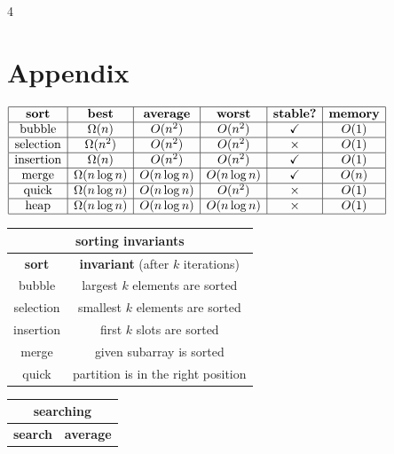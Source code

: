 \documentclass[fontsize=6pt, landscape, a4paper]{scrartcl}
\newenvironment{tightcenter}{%
  \setlength\topsep{0pt}
  \setlength\parskip{0pt}
  \begin{center}
}{%
  \end{center}
}
\begin{document}
\begin{multicols*}{4}
        \section*{Appendix}
        \begin{tightcenter}
        $
            \begin{array}{| c | c | c | c | c | c |}
                \hline\textbf{sort} & \textbf{best} & \textbf{average} & \textbf{worst} & \textbf{stable?} & \textbf{memory}
                \\\hline\text{bubble} & \Omega(n) & O(n^{2}) & O(n^{2}) & \checkmark & O(1)
                \\\hline\text{selection} & \Omega(n^{2}) & O(n^{2}) & O(n^{2}) & \times & O(1)
                \\\hline\text{insertion} & \Omega(n) & O(n^{2}) & O(n^{2}) & \checkmark & O(1)
                \\\hline\text{merge} & \Omega(n\log n) & O(n\log n) & O(n\log n) & \checkmark & O(n)
                \\\hline\text{quick} & \Omega(n\log n) & O(n\log n) & O(n^{2}) & \times & O(1)
                \\\hline\text{heap} & \Omega(n\log n) & O(n\log n) & O(n\log n) & \times & O(1)
                \\\hline
            \end{array}
        $ \\
        \begin{tabular}{| c | c |}
            \multicolumn{2}{c}{sorting invariants}
            \\\hline\textbf{sort} & \textbf{invariant} (after $k$ iterations)
            \\\hline bubble & largest $k$ elements are sorted
            \\\hline selection & smallest $k$ elements are sorted
            \\\hline insertion & first $k$ slots are sorted
            \\\hline merge & given subarray is sorted
            \\\hline quick & partition is in the right position
            \\\hline
        \end{tabular} \begin{tabular}{| c | c |}
            \multicolumn{2}{c}{searching}         \\\hline
            \textbf{search} & \textbf{average}    \\\hline

\end{tabular}
\end{tightcenter}
\end{multicols*}
\end{document}
